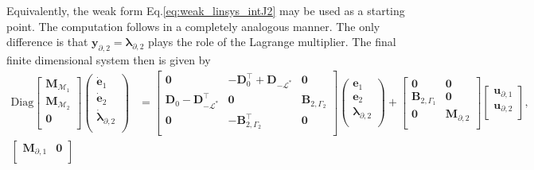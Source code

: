 Equivalently, the weak form Eq.\ref{eq:weak_linsys_intJ2} may be used as a starting point. The computation follows in a completely analogous manner. The only difference is that $\bm{y}_{\partial, 2}=\bm{\lambda}_{\partial, 2}$ plays the role of the Lagrange multiplier. The final finite dimensional system then is given by
\begin{equation}\label{eq:pHsys_infdim_mult2}
\begin{aligned}
\mathrm{Diag}
\begin{bmatrix}
\mathbf{M}_{\mathcal{M}_1}\\
\mathbf{M}_{\mathcal{M}_2}\\
\mathbf{0}\\
\end{bmatrix}
\begin{pmatrix}
\dot{\mathbf{e}}_{1} \\
\dot{\mathbf{e}}_{2} \\
\dot{\bm{\lambda}}_{\partial, 2} \\
\end{pmatrix}
&= \begin{bmatrix}
\mathbf{0} & -\mathbf{D}_{0}^\top + \mathbf{D}_ {-\mathcal{L}^*} & \mathbf{0}\\
\mathbf{D}_{0} - \mathbf{D}_ {-\mathcal{L}^*}^\top & \mathbf{0} & \mathbf{B}_{2, \Gamma_2} \\
\mathbf{0} & -\mathbf{B}_{2, \Gamma_2}^\top & \mathbf{0}  \\
\end{bmatrix} 
\begin{pmatrix}
\mathbf{e}_{1} \\
\mathbf{e}_{2} \\
{\bm{\lambda}}_{\partial, 2} \\
\end{pmatrix} + 
\begin{bmatrix}
\mathbf{0} & \mathbf{0} \\
 \mathbf{B}_{2, \Gamma_1} & \mathbf{0} \\
\mathbf{0} & \mathbf{M}_{\partial, 2} \\
\end{bmatrix}
\begin{bmatrix}
\mathbf{u}_{\partial, 1} \\
\mathbf{u}_{\partial, 2} \\
\end{bmatrix}, \\
\begin{bmatrix}
\mathbf{M}_{\partial, 1} & \mathbf{0} \\

\end{bmatrix}
\end{aligned}
\end{equation}
